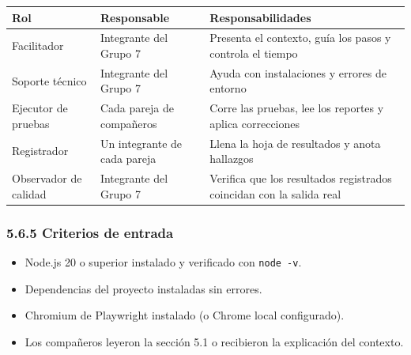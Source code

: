 \documentclass[10pt,letterpaper,onecolumn]{IEEEtran}
\newcommand{\filafina}{\arrayrulecolor{black!30}\specialrule{0.3pt}{1.5pt}{1.5pt}\arrayrulecolor{black}}
\begin{document}
\begin{longtable}[]{@{}
  >{\raggedright\arraybackslash}p{0.2740\dimexpr\linewidth-4\tabcolsep\relax}
  >{\raggedright\arraybackslash}p{0.2466\dimexpr\linewidth-4\tabcolsep\relax}
  >{\raggedright\arraybackslash}p{0.4795\dimexpr\linewidth-4\tabcolsep\relax}@{}}
\toprule\noalign{}
\begin{minipage}[b]{\linewidth}\raggedright
Rol
\end{minipage} & \begin{minipage}[b]{\linewidth}\raggedright
Responsable
\end{minipage} & \begin{minipage}[b]{\linewidth}\raggedright
Responsabilidades
\end{minipage} \\
\midrule\noalign{}
\endhead
\bottomrule\noalign{}
\endlastfoot
Facilitador & Integrante del Grupo 7 & Presenta el contexto, guía los pasos y controla el tiempo \\ \filafina
Soporte técnico & Integrante del Grupo 7 & Ayuda con instalaciones y errores de entorno \\ \filafina
Ejecutor de pruebas & Cada pareja de compañeros & Corre las pruebas, lee los reportes y aplica correcciones \\ \filafina
Registrador & Un integrante de cada pareja & Llena la hoja de resultados y anota hallazgos \\ \filafina
Observador de calidad & Integrante del Grupo 7 & Verifica que los resultados registrados coincidan con la salida real \\
\end{longtable}

\subsubsection{5.6.5 Criterios de entrada}\label{criterios-de-entrada}

\begin{itemize}
\item
  Node.js 20 o superior instalado y verificado con \texttt{node -\allowbreak{}\allowbreak{}v}.
\item
  Dependencias del proyecto instaladas sin errores.
\item
  Chromium de Playwright instalado (o Chrome local configurado).
\item
  Los compañeros leyeron la sección 5.1 o recibieron la explicación del contexto.
\end{itemize}
\end{document}
